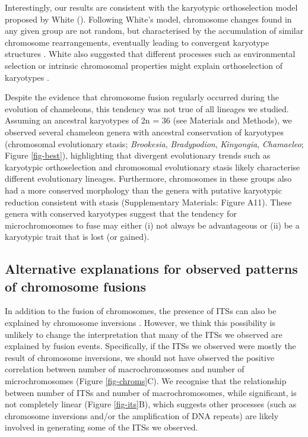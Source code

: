 \documentclass[a4paper, 12pt]{article}
\begin{document}
Interestingly, our results are consistent with the karyotypic orthoselection model proposed by White (\citeyear{white1973,white1975chromosome}). 
Following White's model, chromosome changes found in any given group are not random, but characterised by the accumulation of similar chromosome rearrangements, eventually leading to convergent karyotype structures \citep{white1973,white1975chromosome}. 
White also suggested that different processes such as environmental selection or intrinsic chromosomal properties might explain orthoselection of karyotypes \citep{white1973,white1975chromosome}.

Despite the evidence that chromosome fusion regularly occurred during the evolution of chameleons, this tendency was not true of all lineages we studied. Assuming an ancestral karyotypes of 2n = 36 \citep{rovatsos2017evolution} (see Materials and Methods), we observed several chameleon genera with ancestral conservation of karyotypes (chromosomal evolutionary stasis; \textit{Brookesia}, \textit{Bradypodion}, \textit{Kinyongia}, \textit{Chamaeleo}; Figure \ref{fig-best}), highlighting that divergent evolutionary trends such as karyotypic orthoselection and chromosomal evolutionary stasis likely characterise different evolutionary lineages. 
Furthermore, chromosomes in these groups also had a more conserved morphology than the genera with putative karyotypic reduction consistent with stasis (Supplementary Materials: Figure A11). 
These genera with conserved karyotypes suggest that the tendency for microchromosomes to fuse may either (i) not always be advantageous or (ii) be a karyotypic trait that is lost (or gained). 

\subsection{Alternative explanations for observed patterns of chromosome fusions}
In addition to the fusion of chromosomes, the presence of ITSs can also be explained by chromosome inversions \citep{bolzan2017interstitial}. 
However, we think this possibility is unlikely to change the interpretation that many of the ITSs we observed are explained by fusion events. 
Specifically, if the ITSs we observed were mostly the result of chromosome inversions, we should not have observed the positive correlation between number of macrochromosomes and number of microchromosomes (Figure \ref{fig-chroms}C). 
We recognise that the relationship between number of ITSs and number of macrochromosomes, while significant, is not completely linear (Figure \ref{fig-its}B), which suggests other processes (such as chromosome inversions and/or the amplification of DNA repeats) are likely involved in generating some of the ITSs we observed.
\end{document}
